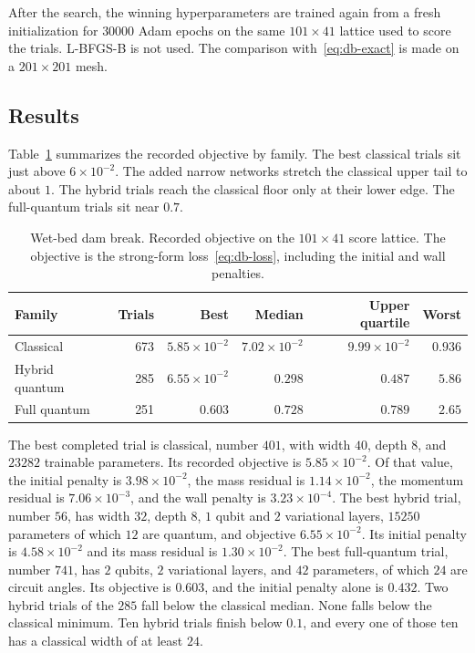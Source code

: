 \documentclass[11pt]{article}
\begin{document}
After the search, the winning hyperparameters are trained again from a fresh initialization for \(30000\) Adam epochs on the same \(101\times 41\) lattice used to score the trials. L-BFGS-B is not used. The comparison with~\eqref{eq:db-exact} is made on a \(201\times 201\) mesh.

\subsection{Results}
\label{sec:dambreak-results}

Table~\ref{tab:db-spread} summarizes the recorded objective by family. The best classical trials sit just above \(6\times 10^{-2}\). The added narrow networks stretch the classical upper tail to about \(1\). The hybrid trials reach the classical floor only at their lower edge. The full-quantum trials sit near \(0.7\).

\begin{table}[ht]
\centering
\caption{Wet-bed dam break. Recorded objective on the \(101\times 41\) score lattice. The objective is the strong-form loss~\eqref{eq:db-loss}, including the initial and wall penalties.}
\label{tab:db-spread}
\begin{tabular}{lrrrrr}
\toprule
Family & Trials & Best & Median & Upper quartile & Worst \\
\midrule
Classical      & 673 & \(5.85\times 10^{-2}\) & \(7.02\times 10^{-2}\) & \(9.99\times 10^{-2}\) & \(0.936\) \\
Hybrid quantum & 285 & \(6.55\times 10^{-2}\) & \(0.298\)            & \(0.487\)            & \(5.86\) \\
Full quantum   & 251 & \(0.603\)            & \(0.728\)            & \(0.789\)            & \(2.65\) \\
\bottomrule
\end{tabular}
\end{table}

The best completed trial is classical, number \(401\), with width \(40\), depth \(8\), and \(23282\) trainable parameters. Its recorded objective is \(5.85\times 10^{-2}\). Of that value, the initial penalty is \(3.98\times 10^{-2}\), the mass residual is \(1.14\times 10^{-2}\), the momentum residual is \(7.06\times 10^{-3}\), and the wall penalty is \(3.23\times 10^{-4}\). The best hybrid trial, number \(56\), has width \(32\), depth \(8\), \(1\) qubit and \(2\) variational layers, \(15250\) parameters of which \(12\) are quantum, and objective \(6.55\times 10^{-2}\). Its initial penalty is \(4.58\times 10^{-2}\) and its mass residual is \(1.30\times 10^{-2}\). The best full-quantum trial, number \(741\), has \(2\) qubits, \(2\) variational layers, and \(42\) parameters, of which \(24\) are circuit angles. Its objective is \(0.603\), and the initial penalty alone is \(0.432\). Two hybrid trials of the \(285\) fall below the classical median. None falls below the classical minimum. Ten hybrid trials finish below \(0.1\), and every one of those ten has a classical width of at least \(24\).
\end{document}
